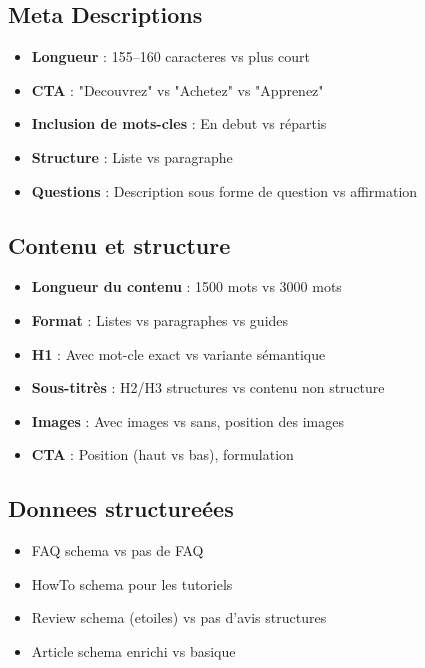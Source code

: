 \subsection{Meta Descriptions}

\begin{itemize}
    \item \textbf{Longueur} : 155--160 caracteres vs plus court
    \item \textbf{CTA} : "Decouvrez" vs "Achetez" vs "Apprenez"
    \item \textbf{Inclusion de mots-cles} : En debut vs répartis
    \item \textbf{Structure} : Liste vs paragraphe
    \item \textbf{Questions} : Description sous forme de question vs affirmation
\end{itemize}

\subsection{Contenu et structure}

\begin{itemize}
    \item \textbf{Longueur du contenu} : 1500 mots vs 3000 mots
    \item \textbf{Format} : Listes vs paragraphes vs guides
    \item \textbf{H1} : Avec mot-cle exact vs variante sémantique
    \item \textbf{Sous-titrès} : H2/H3 structures vs contenu non structure
    \item \textbf{Images} : Avec images vs sans, position des images
    \item \textbf{CTA} : Position (haut vs bas), formulation
\end{itemize}

\subsection{Donnees structureées}

\begin{itemize}
    \item FAQ schema vs pas de FAQ
    \item HowTo schema pour les tutoriels
    \item Review schema (etoiles) vs pas d'avis structures
    \item Article schema enrichi vs basique
\end{itemize}


